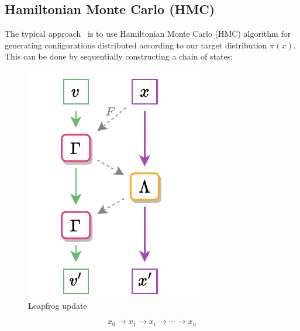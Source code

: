 \documentclass[a4paper,11pt]{article}
\begin{document}
\subsection{\label{subsec:hmc}Hamiltonian Monte Carlo (HMC)}
%
The typical approach~\cite{foreman_deep_2021,foreman_leapfroglayers_2022} is to use 
%
Hamiltonian Monte Carlo (HMC) algorithm for generating configurations 
%
distributed according to our target distribution $\pi(x)$.
%
This can be done by sequentially constructing a chain of states:
%
\begin{figure}
  \begin{center}
  \caption{\label{fig:hmc-update}Leapfrog update}
  \includegraphics[width=\linewidth]{assets/hmc-update11.pdf}
  \end{center}
\end{figure}
%
\begin{equation}
x_{0} \rightarrow x_{1} \rightarrow x_{i} \rightarrow \cdots \rightarrow x_{n}
\end{equation}
\end{document}
